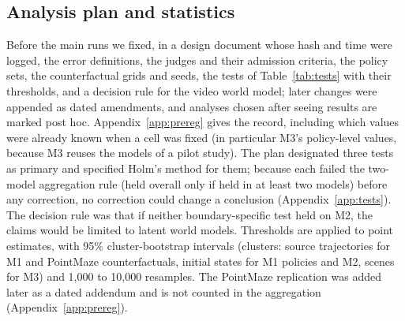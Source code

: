 \documentclass[10pt]{article}
\begin{document}
\subsection{Analysis plan and statistics}
\label{sec:prereg}
Before the main runs we fixed, in a design document whose hash and time were logged, the error definitions, the judges and their admission criteria, the policy sets, the counterfactual grids and seeds, the tests of Table~\ref{tab:tests} with their thresholds, and a decision rule for the video world model; later changes were appended as dated amendments, and analyses chosen after seeing results are marked post hoc. Appendix~\ref{app:prereg} gives the record, including which values were already known when a cell was fixed (in particular M3's policy-level values, because M3 reuses the models of a pilot study). The plan designated three tests as primary and specified Holm's method \citep{holm1979simple} for them; because each failed the two-model aggregation rule (held overall only if held in at least two models) before any correction, no correction could change a conclusion (Appendix~\ref{app:tests}). The decision rule was that if neither boundary-specific test held on M2, the claims would be limited to latent world models. Thresholds are applied to point estimates, with 95\% cluster-bootstrap intervals (clusters: source trajectories for M1 and PointMaze counterfactuals, initial states for M1 policies and M2, scenes for M3) and 1,000 to 10,000 resamples. The PointMaze replication was added later as a dated addendum and is not counted in the aggregation (Appendix~\ref{app:prereg}).
\end{document}
